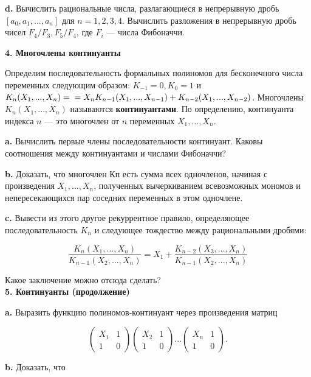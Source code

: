 \documentclass{mai_book}
\begin{document}
\textbf{d.} Вычислить рациональные числа, разлагающиеся в непрерывную
дробь $[a_0,a_1,...,a_n]$ для $n=1,2,3,4$. Вычислить разложения в 
непрерывную дробь чисел $F_4/F_3,F_5/F_4$, где $F_i$ — числа Фибоначчи.
\\

\restoretop
{}

\noindent \textbf{4. Многочлены континуанты}

Определим последовательность формальных полиномов для 
бесконечного числа переменных следующим образом: $K_{-1} = 0, K_0 = 1$ и
$K_n(X_1,...,X_n)= \\ =X_nK_{n-1}(X_1,...,X_{n-1})+K_{n-2}(X_1,...,X_{n-2})$. Многочлены $K_n(X_1,...,X_n)$ называются \textbf{континуантами}. По определению, континуанта индекса $n$ — это многочлен от $n$ переменных $X_1,...,X_n$.

\textbf{a.} Вычислить первые члены последовательности континуант. Каковы соотношения между континуантами и числами Фибоначчи?

\textbf{b.} Доказать, что многочлен Кп есть сумма всех одночленов, 
начиная с произведения $X_1,...,X_n$, полученных вычеркиванием 
всевозможных мономов и непересекающихся пар соседних переменных в этом 
одночлене.

\textbf{c.} Вывести из этого другое рекуррентное правило, определяющее
последовательность $K_n$ и следующее тождество между рациональными
дробями:

\[
\frac{K_n(X_1,...,X_n)}{K_{n-1}(X_2,...,X_n)} = X_1+\frac{K_{n-2}(X_3,...,X_n)}{K_{n-1}(X_2,...,X_n)}
\]

\noindent Какое заключение можно отсюда сделать?
\\

\noindent \textbf{5. Континуанты (продолжение)}

\textbf{a.} Выразить функцию полиномов-континуант через произведения
матриц

\[
\begin{pmatrix}
X_1 & 1\\
1 & 0
\end{pmatrix} \begin{pmatrix}
X_2 & 1\\
1 & 0
\end{pmatrix} ... \begin{pmatrix}
X_n & 1\\
1 & 0
\end{pmatrix}.
\]

\textbf{b.} Доказать, что
\end{document}
